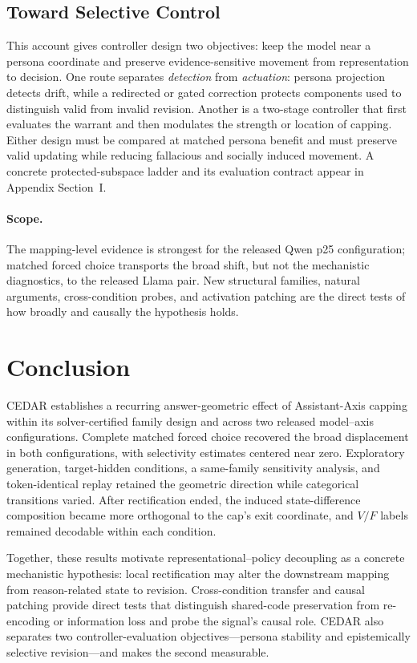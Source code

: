 \documentclass[letterpaper]{article} %
\begin{document}
\subsection{Toward Selective Control}

This account gives controller design two objectives: keep the model near a persona coordinate and preserve evidence-sensitive movement from representation to decision. One route separates \emph{detection} from \emph{actuation}: persona projection detects drift, while a redirected or gated correction protects components used to distinguish valid from invalid revision. Another is a two-stage controller that first evaluates the warrant and then modulates the strength or location of capping. Either design must be compared at matched persona benefit and must preserve valid updating while reducing fallacious and socially induced movement. A concrete protected-subspace ladder and its evaluation contract appear in Appendix Section~I.

\paragraph{Scope.}
The mapping-level evidence is strongest for the released Qwen p25 configuration; matched forced choice transports the broad shift, but not the mechanistic diagnostics, to the released Llama pair. New structural families, natural arguments, cross-condition probes, and activation patching are the direct tests of how broadly and causally the hypothesis holds.

\section{Conclusion}
\label{sec:conclusion}

CEDAR establishes a recurring answer-geometric effect of Assistant-Axis capping within its solver-certified family design and across two released model--axis configurations. Complete matched forced choice recovered the broad displacement in both configurations, with selectivity estimates centered near zero. Exploratory generation, target-hidden conditions, a same-family sensitivity analysis, and token-identical replay retained the geometric direction while categorical transitions varied. After rectification ended, the induced state-difference composition became more orthogonal to the cap's exit coordinate, and $V/F$ labels remained decodable within each condition.

Together, these results motivate representational--policy decoupling as a concrete mechanistic hypothesis: local rectification may alter the downstream mapping from reason-related state to revision. Cross-condition transfer and causal patching provide direct tests that distinguish shared-code preservation from re-encoding or information loss and probe the signal's causal role. CEDAR also separates two controller-evaluation objectives---persona stability and epistemically selective revision---and makes the second measurable.


\end{document}
